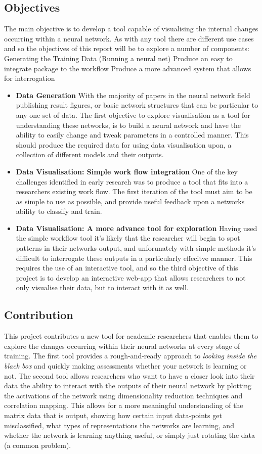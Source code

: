 \documentclass[a4paper,11pt,titlepage]{article}
\begin{document}
	\subsection{Objectives}
	The main objective is to develop a tool capable of visualising the internal changes occurring within a neural network. As with any tool there are different use cases and so the objectives of this report will be to explore a number of components:
	Generating the Training Data (Running a neural net)
Produce an easy to integrate package to the workflow
Produce a more advanced system that allows for interrogation
		\begin{itemize}
			\item \textbf{Data Generation} With the majority of papers in the neural network field publishing result figures, or basic network structures that can be particular to any one set of data. The first objective to explore visualisation as a tool for understanding these networks, is to build a neural network and have the ability to easily change and tweak parameters in a controlled manner. This should produce the required data for using data visualisation upon, a collection of different models and their outputs. 
			\item \textbf{Data Visualisation: Simple work flow integration} One of the key challenges identified in early research was to produce a tool that fits into a researchers existing work flow. The first iteration of the tool must aim to be as simple to use as possible, and provide useful feedback upon a networks ability to classify and train.
			\item \textbf{Data Visualisation: A more advance tool for exploration} Having used the simple workflow tool it's likely that the researcher will begin to spot patterns in their networks output, and unforunately with simple methods it's difficult to interrogate these outputs in a particularly effecitve manner. This requires the use of an interactive tool, and so the third objective of this project is to develop an interactive web-app that allows researchers to not only visualise their data, but to interact with it as well.
		\end{itemize}

	\subsection{Contribution}
	This project contributes a new tool for academic researchers that enables them to explore the changes occurring within their neural networks at every stage of training. The first tool provides a rough-and-ready approach to \textit{looking inside the black box} and quickly making assessments whether your network is learning or not. The second tool allows researchers who want to have a closer look into their data the ability to interact with the outputs of their neural network by plotting the activations of the network using dimensionality reduction techniques and correlation mapping. This allows for a more meaningful understanding of the matrix data that is output, showing how certain input data-points get misclassified, what types of representations the networks are learning, and whether the network is learning anything useful, or simply just rotating the data (a common problem).
	
\end{document}
